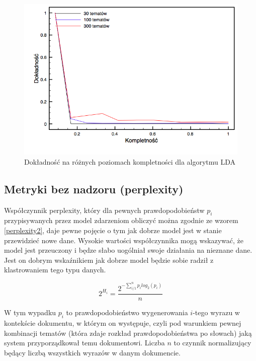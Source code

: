 \documentclass[11pt,a4paper]{article}
\begin{document}
\begin{figure}[h]
\includegraphics[width=\linewidth]{gfx/lda_precision.png}
\caption{Dokładność na różnych poziomach kompletności dla algorytmu LDA}
\label{fig:lda_precision}
\end{figure}

\FloatBarrier

\subsection{Metryki bez nadzoru (perplexity)}

Współczynnik perplexity, który dla pewnych prawdopodobieństw $p_i$
przypisywanych przez model zdarzeniom obliczyć można zgodnie ze wzorem
\ref{perplexity2}, daje pewne pojęcie o tym jak dobrze model jest w stanie
przewidzieć nowe dane. Wysokie wartości współczynnika mogą wskazywać, że model
jest przeuczony i będze słabo uogólniał swoje działania na nieznane dane. Jest
on dobrym wskaźnikiem jak dobrze model będzie sobie radził z klastrowaniem tego
typu danych.

\begin{equation}
  \label{perplexity2}
  2^{H_i} = \frac{2^{-\sum_{i/1}^n p_ilog_2(p_i)}}{n}
\end{equation}

W tym wypadku $p_i$ to prawdopodobieństwo wygenerowania $i$-tego wyrazu w
kontekście dokumentu, w którym on występuje, czyli pod warunkiem pewnej
kombinacji tematów (która zdaje rozkład prawdopodobieństwa po słowach) jaką
system przyporządkował temu dokumentowi. Liczba $n$ to czynnik normalizujący
będący liczbą wszystkich wyrazów w danym dokumencie.
\end{document}

